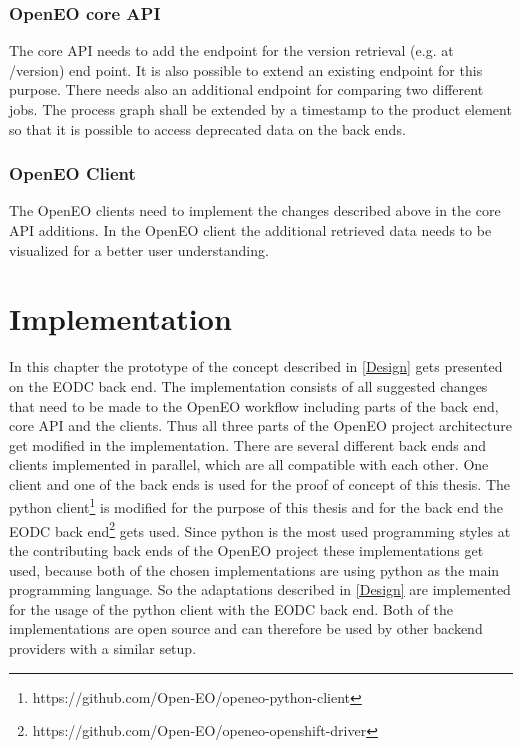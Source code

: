 \documentclass[draft,final]{vutinfth} %
\begin{document}
\subsection{OpenEO core API}\label{Design:OpenEO core API}
The core API needs to add the endpoint for the version retrieval (e.g. at /version) end point. It is also possible to extend an existing endpoint for this purpose. 
There needs also an additional endpoint for comparing two different jobs. 
The process graph shall be extended by a timestamp to the product element so that it is possible to access deprecated data on the back ends.
\subsection{OpenEO Client}\label{Design:OpenEO Client}
The OpenEO clients need to implement the changes described above in the core API additions. In the OpenEO client the additional retrieved data needs to be visualized for a better user understanding.


\chapter{Implementation}\label{Implementation}
In this chapter the prototype of the concept described in \ref{Design} gets presented on the EODC back end. The implementation consists of all suggested changes that need to be made to the OpenEO workflow including parts of the back end, core API and the clients. Thus all three parts of the OpenEO project architecture get modified in the implementation. There are several different back ends and clients implemented in parallel, which are all compatible with each other. One client and one of the back ends is used for the proof of concept of this thesis. The python client\footnote{https://github.com/Open-EO/openeo-python-client} is modified for the purpose of this thesis and for the back end the EODC back end\footnote{https://github.com/Open-EO/openeo-openshift-driver} gets used. Since python is the most used programming styles at the contributing back ends of the OpenEO project these implementations get used, because both of the chosen implementations are using python as the main programming language. So the adaptations described in \ref{Design} are implemented for the usage of the python client with the EODC back end. Both of the implementations are open source and can therefore be used by other backend providers with a similar setup.  
\end{document}
